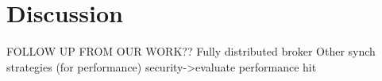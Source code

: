 \section{Discussion}
\label{discussion}
FOLLOW UP FROM OUR WORK??
Fully distributed broker
Other synch strategies (for performance)
security->evaluate performance hit
